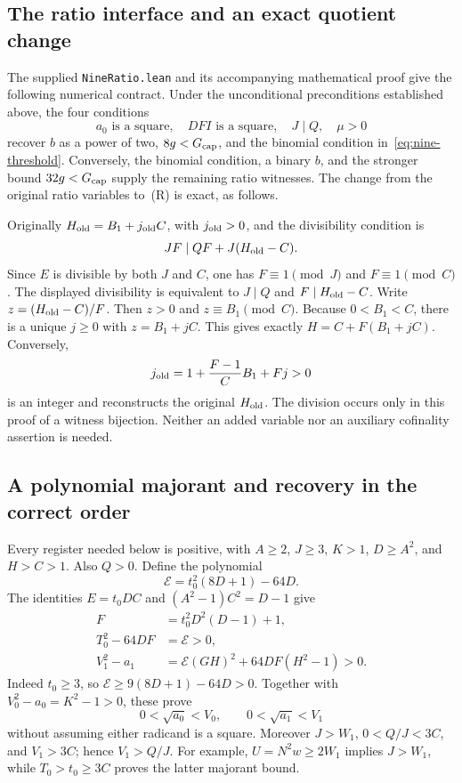 \subsection{The ratio interface and an exact quotient change}
The supplied \texttt{NineRatio.lean} and its accompanying mathematical
proof give the following numerical contract. Under the unconditional
preconditions established above, the four conditions
\[
 a_0\text{ is a square},\quad DFI\text{ is a square},\quad
 J\mid Q,\quad \mu>0                                      \tag{R}
\]
recover $b$ as a power of two, $8g<G_{\rm cap}$, and the binomial
condition in~\eqref{eq:nine-threshold}. Conversely, the binomial condition,
a binary $b$, and the stronger bound $32g<G_{\rm cap}$ supply the
remaining ratio witnesses. The change from the original ratio variables
to~(R) is exact, as follows.

Originally $H_{\rm old}=B_1+j_{\rm old}C$, with $j_{\rm old}>0$, and the
divisibility condition is
\[
 JF\mid QF+J(H_{\rm old}-C).
\]
Since $E$ is divisible by both $J$ and $C$, one has
$F\equiv1\pmod J$ and $F\equiv1\pmod C$. The displayed divisibility is
equivalent to $J\mid Q$ and $F\mid H_{\rm old}-C$.
Write $z=(H_{\rm old}-C)/F$. Then $z>0$ and $z\equiv B_1\pmod C$.
Because $0<B_1<C$, there is a unique $j\geq0$ with $z=B_1+jC$.
This gives exactly $H=C+F(B_1+jC)$. Conversely,
\[
 j_{\rm old}=1+\frac{F-1}{C}B_1+Fj>0
\]
is an integer and reconstructs the original $H_{\rm old}$.
The division occurs only in this proof of a witness bijection. Neither
an added variable nor an auxiliary cofinality assertion is needed.

\subsection{A polynomial majorant and recovery in the correct order}
Every register needed below is positive, with $A\geq2$, $J\geq3$, $K>1$,
$D\geq A^2$, and $H>C>1$. Also $Q>0$. Define the polynomial
\[
 \mathcal E=t_0^2(8D+1)-64D.
\]
The identities $E=t_0DC$ and $(A^2-1)C^2=D-1$ give
\begin{equation}\label{eq:nine-majorant}
\begin{aligned}
 F&=t_0^2D^2(D-1)+1,\\
 T_0^2-64DF&=\mathcal E>0,\\
 V_1^2-a_1&=\mathcal E(GH)^2+64DF(H^2-1)>0.
\end{aligned}
\end{equation}
Indeed $t_0\geq3$, so $\mathcal E\geq9(8D+1)-64D>0$.
Together with $V_0^2-a_0=K^2-1>0$, these prove
\[
 0<\sqrt{a_0}<V_0,\qquad 0<\sqrt{a_1}<V_1
\]
without assuming either radicand is a square. Moreover $J>W_1$,
$0<Q/J<3C$, and $V_1>3C$; hence $V_1>Q/J$.
For example, $U=N^2w\geq2W_1$ implies $J>W_1$, while
$T_0>t_0\geq3C$ proves the latter majorant bound.


